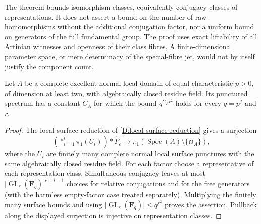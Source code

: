 \begin{remark}
\label{D:uniform-local-growth-scope}
The theorem bounds isomorphism classes, equivalently conjugacy classes
of representations. It does not assert a bound on the number of raw
homomorphisms without the additional conjugation factor, nor a
uniform bound on generators of the full fundamental group.
The proof uses exact liftability of all Artinian witnesses and
openness of their class fibres. A finite-dimensional parameter
space, or mere determinacy of the special-fibre jet, would not
by itself justify the component count.
\end{remark}

\begin{corollary}
\label{D:uniform-local-growth-all-dimensions}
Let \(A\) be a complete excellent normal local domain of equal
characteristic \(p>0\), of dimension at least two, with algebraically
closed residue field. Its punctured spectrum has a constant \(C_A\)
for which the bound \(q^{C_A r^2}\) holds for every \(q=p^f\) and \(r\).
\end{corollary}

\begin{proof}
The local surface reduction of
\ref{D:local-surface-reduction} gives a surjection
\[
 \left(\mathop{*}_{i=1}^{t}\pi_1(U_i)\right)
                *\widehat F_e\longrightarrow
       \pi_1(\operatorname{Spec}(A)\setminus\{\mathfrak m_A\}),
\]
where the \(U_i\) are finitely many complete normal local surface
punctures with the same algebraically closed residue field.
For each factor choose a representative of each representation
class. Simultaneous conjugacy leaves at most
\(\lvert\operatorname{GL}_r(\mathbf F_q)\rvert^{e+t-1}\)
choices for relative conjugations and for the free generators
(with the harmless empty-factor case treated separately).
Multiplying the finitely many surface bounds and using
\(\lvert\operatorname{GL}_r(\mathbf F_q)\rvert\leq q^{r^2}\)
proves the assertion. Pullback along the displayed surjection
is injective on representation classes.
\end{proof}


